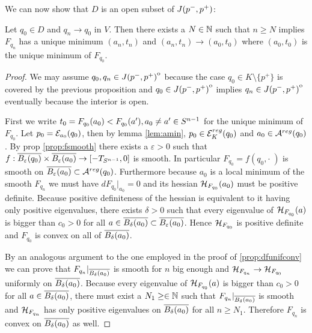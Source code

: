 We can now show that $D$ is an open subset of $J(p^-,p^+)$:
\begin{proposition}\label{prop:globalminconv}
    Let $q_0\in D$ and $q_n\to q_0$ in $V$. Then there exists a $N\in \mathbb{N}$ such that $n\ge N$ implies $F_{q_n}$ has a unique minimum $(a_n,t_n)$ and $(a_n,t_n)\to (a_0,t_0)$ where $(a_0,t_0)$ is the unique minimum of $F_{q_0}$.
\end{proposition}
\begin{proof}
    We may assume $q_0,q_n \in {\kern0ptJ(p^-,p^+)}^{\mathrm{o}}$ because the case $q_0\in K\setminus\{p^+\}$ is covered by the previous proposition and $q_0\in {\kern0ptJ(p^-,p^+)}^{\mathrm{o}}$ implies $q_n\in {\kern0ptJ(p^-,p^+)}^{\mathrm{o}}$ eventually because the interior is open.

    First we write $t_0=F_{q_0}(a_0)<F_{q_0}(a'), a_0\neq a'\in {S^{n-1}}$ for the unique minimum of $F_{q_0}$. Let $p_0 = {\mathcal{E}}_{a_0}(q_0)$, then by lemma \ref{lem:amin}, $p_0\in {{\mathcal{E}}^{reg}_K}(q_0)$ and $a_0\in {{\mathcal{A}}^{reg}}(q_0)$. By prop \ref{prop:fsmooth} there exists a $\varepsilon>0$ such that $f:{\overline{B_\varepsilon(q_0)}}\times{\overline{B_\varepsilon(a_0)}}\to [-T_{S^{n-1}},0]$ is smooth. In particular $F_{q_0}=f(q_0,\cdot\;)$ is smooth on ${\overline{B_\varepsilon(a_0)}}\subset {{\mathcal{A}}^{reg}}(q_0)$. Furthermore because $a_0$ is a local minimum of the smooth $F_{q_n}$ we must have $dF_{q_0}\rvert_{a_0}=0$ and its hessian ${\mathcal{H}}_{F_{q_0}}(a_0)$ must be positive definite. Because positive definiteness of the hessian is equivalent to it having only positive eigenvalues, there exists $\delta>0$ such that every eigenvalue of ${\mathcal{H}}_{F_{q_0}}(a)$ is bigger than $c_0>0$ for all $a\in {\overline{B_\delta(a_0)}}\subset {\overline{B_\varepsilon(a_0)}}$. Hence ${\mathcal{H}}_{F_{q_0}}$ is positive definite and $F_{q_0}$ is convex on all of ${\overline{B_\delta(a_0)}}$.

    By an analogous argument to the one employed in the proof of \ref{prop:dfunifconv} we can prove that $F_{q_n}\rvert_{{\overline{B_\delta(a_0)}}}$ is smooth for $n$ big enough and ${\mathcal{H}}_{F_{q_n}}\to {\mathcal{H}}_{F_{q_0}}$ uniformly on ${\overline{B_\delta(a_0)}}$. Because every eigenvalue of ${\mathcal{H}}_{F_{q_0}}(a)$ is bigger than $c_0>0$ for all $a\in {\overline{B_\delta(a_0)}}$, there must exist a $N_1\ge \in \mathbb{N}$ such that $F_{q_n}\rvert_{{\overline{B_\delta(a_0)}}}$ is smooth and ${\mathcal{H}}_{F_{q_n}}$ has only positive eigenvalues on ${\overline{B_\delta(a_0)}}$ for all $n \ge N_1$. Therefore $F_{q_n}$ is convex on ${\overline{B_\delta(a_0)}}$ as well.
    

\end{proof}
